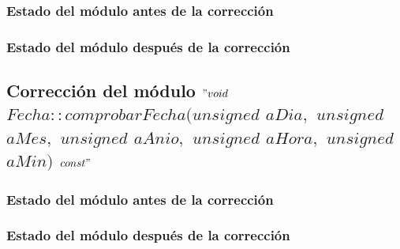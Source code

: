 	\subsubsection{Estado del módulo antes de la corrección}
	
	\subsubsection{Estado del módulo después de la corrección}
	
	\subsection{Corrección del módulo $"void$ $Fecha::comprobarFecha(unsigned$ $aDia,$ $unsigned$ $aMes,$ $unsigned$ $aAnio,$ $unsigned$ $aHora,$ $unsigned$ $aMin)$ $const"$}
	
	\subsubsection{Estado del módulo antes de la corrección}
	
	\subsubsection{Estado del módulo después de la corrección}
\newpage